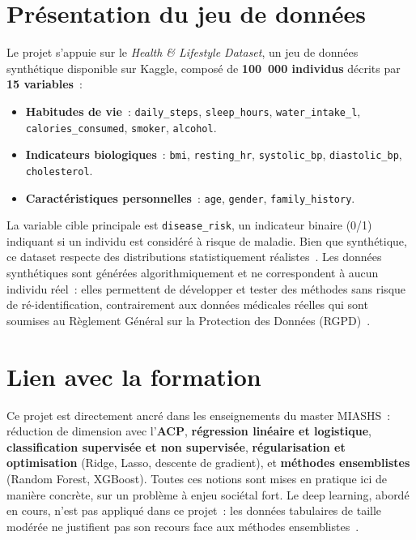 \section*{Présentation du jeu de données}

Le projet s'appuie sur le \textit{Health \& Lifestyle Dataset}, un jeu de données synthétique disponible sur Kaggle, composé de \textbf{100~000 individus} décrits par \textbf{15 variables}~:

\begin{sloppypar}
\begin{itemize}
  \item \textbf{Habitudes de vie}~: \texttt{daily\_steps}, \texttt{sleep\_hours}, \texttt{water\_intake\_l}, \texttt{calories\_consumed}, \texttt{smoker}, \texttt{alcohol}.
  \item \textbf{Indicateurs biologiques}~: \texttt{bmi}, \texttt{resting\_hr}, \texttt{systolic\_bp}, \texttt{diastolic\_bp}, \texttt{cholesterol}.
  \item \textbf{Caractéristiques personnelles}~: \texttt{age}, \texttt{gender}, \texttt{family\_history}.
\end{itemize}
\end{sloppypar}

La variable cible principale est \texttt{disease\_risk}, un indicateur binaire (0/1) indiquant si un individu est considéré à risque de maladie. Bien que synthétique, ce dataset respecte des distributions statistiquement réalistes~\cite{chawla2002}. Les données synthétiques sont générées algorithmiquement et ne correspondent à aucun individu réel~: elles permettent de développer et tester des méthodes sans risque de ré-identification, contrairement aux données médicales réelles qui sont soumises au Règlement Général sur la Protection des Données (RGPD)~\cite{rgpd2016}.

\section*{Lien avec la formation}

Ce projet est directement ancré dans les enseignements du master MIASHS~: réduction de dimension avec l'\textbf{ACP}, \textbf{régression linéaire et logistique}, \textbf{classification supervisée et non supervisée}, \textbf{régularisation et optimisation} (Ridge, Lasso, descente de gradient), et \textbf{méthodes ensemblistes} (Random Forest, XGBoost). Toutes ces notions sont mises en pratique ici de manière concrète, sur un problème à enjeu sociétal fort. Le deep learning, abordé en cours, n'est pas appliqué dans ce projet~: les données tabulaires de taille modérée ne justifient pas son recours face aux méthodes ensemblistes~\cite{hastie2009}.

